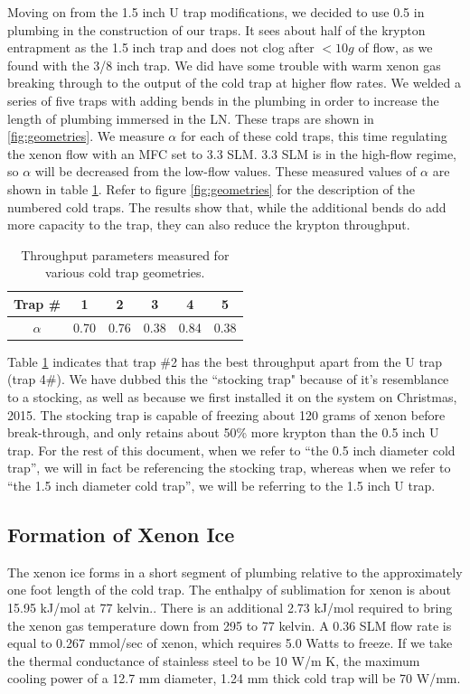 Moving on from the 1.5 inch U trap modifications, we decided to use 0.5 in plumbing in the construction of our traps. It sees about half of the krypton entrapment as the 1.5 inch trap and does not clog after $<10g$ of flow, as we found with the 3/8 inch trap. We did have some trouble with warm xenon gas breaking through to the output of the cold trap at higher flow rates. We welded a series of five traps with adding bends in the plumbing in order to increase the length of plumbing immersed in the LN. These traps are shown in \ref{fig:geometries}. We measure $\alpha$ for each of these cold traps, this time regulating the xenon flow with an MFC set to 3.3 SLM. 3.3 SLM is in the high-flow regime, so $\alpha$ will be decreased from the low-flow values. These measured values of $\alpha$ are shown in table \ref{tab:geo}. Refer to figure \ref{fig:geometries} for the description of the numbered cold traps. The results show that, while the additional bends do add more capacity to the trap, they can also reduce the krypton throughput.
\begin{table}
 \centering
 \begin{tabular}{c || c c c c c}
 \hline
 \hline
 Trap \# & 1 & 2 & 3 & 4 & 5 \\ [0.5ex] 
 \hline\hline
 $\alpha$ & 0.70 & 0.76 & 0.38 & 0.84 & 0.38 \\ [1ex] 
\hline
\end{tabular}
\caption{Throughput parameters measured for various cold trap geometries.}
\label{tab:geo}
\end{table}

Table \ref{tab:geo} indicates that trap \#2 has the best throughput apart from the U trap (trap 4\#). We have dubbed this the ``stocking trap" because of it's resemblance to a stocking, as well as because we first installed it on the system on Christmas, 2015. The stocking trap is capable of freezing about 120 grams of xenon before break-through, and only retains about 50\% more krypton than the 0.5 inch U trap. For the rest of this document, when we refer to ``the 0.5 inch diameter cold trap'', we will in fact be referencing the stocking trap, whereas when we refer to ``the 1.5 inch diameter cold trap'', we will be referring to the 1.5 inch U trap.


\subsection{Formation of Xenon Ice}
\label{sec:iceform}
The xenon ice forms in a short segment of plumbing relative to the approximately one foot length of the cold trap. The enthalpy of sublimation for xenon is about 15.95 kJ/mol at 77 kelvin.\cite{vaporpressure}. There is an additional 2.73 kJ/mol required to bring the xenon gas temperature down from 295 to 77 kelvin. A 0.36 SLM flow rate is equal to 0.267 mmol/sec of xenon, which requires 5.0 Watts to freeze. If we take the thermal conductance of stainless steel to be 10 W/m K, the maximum cooling power of a 12.7 mm diameter, 1.24 mm thick cold trap will be 70 W/mm. 

